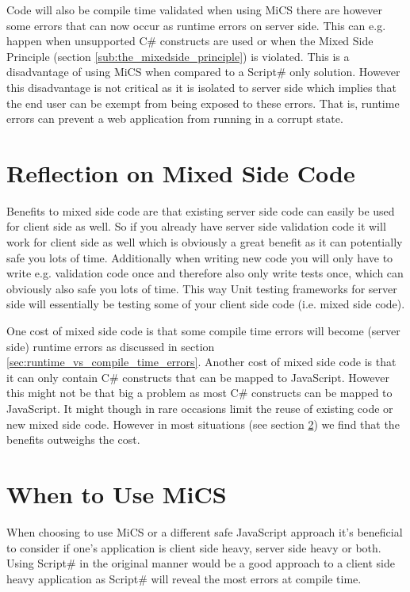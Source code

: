 	Code will also be compile time validated when using MiCS there are however some errors that can now occur as runtime errors on server side. This can e.g. happen when unsupported C\# constructs are used or when the Mixed Side Principle (section \ref{sub:the_mixedside_principle}) is violated. This is a disadvantage of using MiCS when compared to a Script\# only solution. However this disadvantage is not critical as it is isolated to server side which implies that the end user can be exempt from being exposed to these errors. That is, runtime errors can prevent a web application from running in a corrupt state. 


\section{Reflection on Mixed Side Code} %
\label{sec:reflection_on_mixed_side_code}
	Benefits to mixed side code are that existing server side code can easily be used for client side as well. So if you already have server side validation code it will work for client side as well which is obviously a great benefit as it can potentially safe you lots of time. Additionally when writing new code you will only have to write e.g. validation code once and therefore also only write tests once, which can obviously also safe you lots of time. This way Unit testing frameworks for server side will essentially be testing some of your client side code (i.e. mixed side code).

	One cost of mixed side code is that some compile time errors will become (server side) runtime errors as discussed in section \ref{sec:runtime_vs_compile_time_errors}. Another cost of mixed side code is that it can only contain C\# constructs that can be mapped to JavaScript. However this might not be that big a problem as most C\# constructs can be mapped to JavaScript. It might though in rare occasions limit the reuse of existing code or new mixed side code. However in most situations (see section \ref{sec:when_to_use_mics}) we find that the benefits outweighs the cost.


\section{When to Use MiCS} %
\label{sec:when_to_use_mics}
	When choosing to use MiCS or a different safe JavaScript approach it's beneficial to consider if one's application is client side heavy, server side heavy or both. Using Script\# in the original manner would be a good approach to a client side heavy application as Script\# will reveal the most errors at compile time. 

